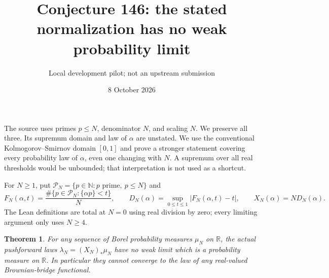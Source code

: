 \documentclass[11pt]{article}
\title{Conjecture 146: the stated normalization has no weak probability limit}
\author{Local development pilot; not an upstream submission}
\date{8 October 2026}
\newtheorem{theorem}{Theorem}
\newcommand{\R}{\mathbb R}
\newcommand{\Pp}{\mathcal P}
\begin{document}
\maketitle
\noindent The source uses primes $p\le N$, denominator $N$, and scaling $N$.
We preserve all three. Its supremum domain and law of $\alpha$ are unstated.
We use the conventional Kolmogorov--Smirnov domain $[0,1]$ and prove a stronger
statement covering every probability law of $\alpha$, even one changing with $N$.
A supremum over all real thresholds would be unbounded; that interpretation is
not used as a shortcut.

For $N\ge1$, put $\Pp_N=\{p\in\mathbb N:p\text{ prime},\ p\le N\}$ and
\[
 F_N(\alpha,t)=\frac{\#\{p\in\Pp_N:\{\alpha p\}<t\}}{N},\qquad
 D_N(\alpha)=\sup_{0\le t\le1}|F_N(\alpha,t)-t|,\qquad
 X_N(\alpha)=N D_N(\alpha).
\]
The Lean definitions are total at $N=0$ using real division by zero; every
limiting argument only uses $N\ge4$.

\begin{theorem}
For any sequence of Borel probability measures $\mu_N$ on $\R$, the actual
pushforward laws $\lambda_N=(X_N)_*\mu_N$ have no weak limit which is a
probability measure on $\R$. In particular they cannot converge to the law of
any real-valued Brownian-bridge functional.
\end{theorem}
\end{document}
